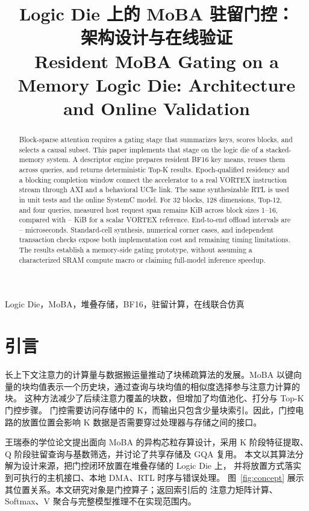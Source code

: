 \documentclass[conference,a4paper]{IEEEtran}
\title{Logic Die 上的 MoBA 驻留门控：\\架构设计与在线验证\\
\large Resident MoBA Gating on a Memory Logic Die: Architecture and Online Validation}
\author{\IEEEauthorblockN{匿名技术稿}
\IEEEauthorblockA{可复现研究原型 \quad 2026 年 9 月}}
\begin{document}
\maketitle

\begin{abstract}
Block-sparse attention requires a gating stage that summarizes keys, scores blocks, and selects a causal subset.
This paper implements that stage on the logic die of a stacked-memory system.
A descriptor engine prepares resident BF16 key means, reuses them across queries, and returns deterministic Top-K results.
Epoch-qualified residency and a blocking completion window connect the accelerator to a real VORTEX instruction stream through AXI and a behavioral UCIe link.
The same synthesizable RTL is used in unit tests and the online SystemC model.
For 32 blocks, 128 dimensions, Top-12, and four queries, measured host request span remains
\HostGateKiB{} KiB across block sizes 1--16, compared with \HostSoftMinKiB{}--\HostSoftMaxKiB{} KiB for a scalar VORTEX reference.
End-to-end offload intervals are \GateMinUs{}--\GateMaxUs{} microseconds.
Standard-cell synthesis, numerical corner cases, and independent transaction checks expose both implementation cost and remaining timing limitations.
The results establish a memory-side gating prototype, without assuming a characterized SRAM compute macro or claiming full-model inference speedup.
\end{abstract}

\begin{IEEEkeywords}
Logic Die，MoBA，堆叠存储，BF16，驻留计算，在线联合仿真
\end{IEEEkeywords}

\section{引言}
长上下文注意力的计算量与数据搬运量推动了块稀疏算法的发展。MoBA
以键向量的块均值表示一个历史块，通过查询与块均值的相似度选择参与注意力计算的块\cite{moba}。
这种方法减少了后续注意力覆盖的块数，但增加了均值池化、打分与 Top-K 门控步骤。
门控需要访问存储中的 K，而输出只包含少量块索引。因此，门控电路的放置位置会影响
K 数据是否需要穿过处理器与存储之间的接口。

王瑞泰的学位论文提出面向 MoBA 的异构芯粒存算设计，采用 K 阶段特征提取、
Q 阶段驻留查询与基数筛选，并讨论了共享存储及 GQA 复用\cite{wang2026}。
本文以其算法分解为设计来源，把门控闭环放置在堆叠存储的 Logic Die 上，
并将放置方式落实到可执行的主机接口、本地 DMA、RTL 时序与错误处理。
图~\ref{fig:concept} 展示其位置关系。本文研究对象是门控算子；返回索引后的
注意力矩阵计算、Softmax、V 聚合与完整模型推理不在实现范围内。
\end{document}
